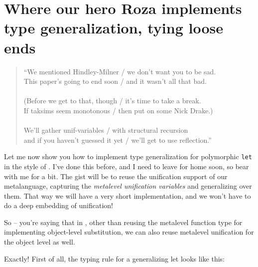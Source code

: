 \section{Where our hero Roza implements type generalization, tying loose
ends}\label{where-our-hero-roza-implements-type-generalization-tying-loose-ends}

\begin{verse}
``We mentioned Hindley-Milner / we don't want you to be sad. \\
This paper's going to end soon / and it wasn't all that bad. \\
\hspace{1em}\vspace{-0.5em} \\
(Before we get to that, though / it's time to take a break. \\
If taksims seem monotonous / then put on some Nick Drake.) \\
\hspace{1em}\vspace{-0.5em} \\
We'll gather unif-variables / with structural recursion \\
and if you haven't guessed it yet / we'll get to use reflection.''
\end{verse}

\heroADVISOR{} Let me now show you how to implement type generalization for
polymorphic \texttt{let} in the style of
\citet{damas1984type,hindley1969principal,milner1978theory}. I've done
this before, and I need to leave for home soon, so bear with me for a
bit. The gist will be to reuse the unification support of our
metalanguage, capturing the \emph{metalevel unification variables} and
generalizing over them. That way we will have a very short
implementation, and we won't have to do a deep embedding of unification!

\heroSTUDENT{} So -- you're saying that in \lamprolog, other than reusing the
metalevel function type for implementing object-level substitution, we
can also reuse metalevel unification for the object level as well.

\identNormal

\heroADVISOR{} Exactly! First of all, the typing rule for a generalizing let
looks like this:

\vspace{-1.2em}\begin{mathpar}
\end{mathpar}

